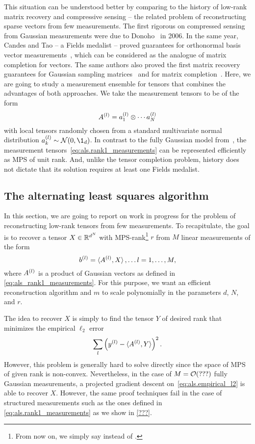 This situation can be understood better by comparing to the history of low-rank matrix recovery and compressive sensing -- the related problem of reconstructing sparse vectors from few measurements.
The first rigorous on compressed sensing from Gaussian measurements were due to Donoho~\cite{For_most} in 2006.
In the same year, Candes and Tao -- a Fields medalist -- proved guarantees for orthonormal basis vector measurements~\cite{Stable_signal}, which can be considered as the analogue of matrix completion for vectors.
The same authors also proved the first matrix recovery guarantees for Gaussian sampling matrices~\cite{} and for matrix completion~\cite{}.
Here, we are going to study a measurement ensemble for tensors that combines the advantages of both approaches.
We take the measurement tensors to be of the form
\[
  A^{(l)} = a^{(l)}_1 \otimes \cdots a^{(l)}_N
  \label{eq:als.rank1_measurements}
\]
with local tensors randomly chosen from a standard multivariate normal distribution $a\ind{l}_k \sim \Normal(0, \1_d)$.
In contrast to the fully Gaussian model from~\cite{}, the measurement tensors~\eqref{eq:als.rank1_measurements} can be represented efficiently as MPS of unit rank.
And, unlike the tensor completion problem, history does not dictate that its solution requires at least one Fields medalist.



\subsection{The alternating least squares algorithm}%

In this section, we are going to report on work in progress for the problem of reconstructing low-rank tensors from few measurements.
To recapitulate, the goal is to recover a tensor $X \in {\mathbb{R}}^{d^N}$ with MPS-rank\footnote{%
  From now on, we simply say  instead of .
} $r$ from $M$ linear measurements of the form
\[
  b^{(l)} = \braket{A^{(l)}, X}, \ldots l=1,\ldots,M,
\]
where $A^{(l)}$ is a product of Gaussian vectors as defined in \cref{eq:als_rank1_measurements}.
For this purpose, we want an efficient reconstruction algorithm and $m$ to scale polynomially in the parameters $d$, $N$, and $r$.

The idea to recover $X$ is simply to find the tensor $Y$ of desired rank that minimizes the empirical $\ell_2$ error
\[
  \sum_l \left( y^{(l)} - \braket{A^{(l)}, Y} \right)^2.
  \label{eq:als.empirical_l2}
\]
However, this problem is generally hard to solve directly since the space of MPS of given rank is non-convex.
Nevertheless, in the case of $M={\mathcal{O}}(???)$ fully Gaussian measurements, a projected gradient descent on~\eqref{eq:als.empirical_l2} is able to recover $X$.
However, the same proof techniques fail in the case of structured measurements such as the ones defined in \cref{eq:als.rank1_measurements} as we show in \cref{???}.


